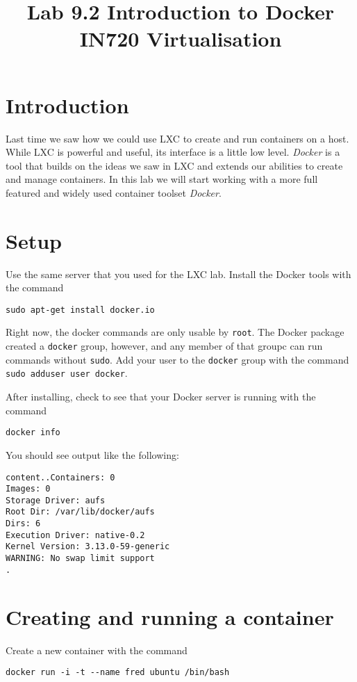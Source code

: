 \documentclass{article}
\begin{document}
\title{Lab 9.2 Introduction to Docker\\ IN720 Virtualisation}
\date{}
\maketitle

\section*{Introduction}
Last time we saw how we could use LXC to create and run containers on a host. While LXC is powerful and useful, its interface is a little low level. \emph{Docker} is a tool that builds on the ideas we saw in LXC and extends our abilities to create and manage containers.  In this lab we will start working with a more full featured and widely used container toolset \emph{Docker}.

\section{Setup}
Use the same server that you used for the LXC lab.  Install the Docker tools with the command

\texttt{sudo apt-get install docker.io}

Right now, the docker commands are only usable by \texttt{root}. The Docker package created a \texttt{docker} group, however, and any member of that groupc can run commands without \texttt{sudo}. Add your user to the \texttt{docker} group with the command \texttt{sudo adduser user docker}.

After installing, check to see that your Docker server is running with the command 

\texttt{docker info}

You should see output like the following:

\begin{verbatim}
content..Containers: 0
Images: 0
Storage Driver: aufs
Root Dir: /var/lib/docker/aufs
Dirs: 6
Execution Driver: native-0.2
Kernel Version: 3.13.0-59-generic
WARNING: No swap limit support
.
\end{verbatim}

\section{Creating and running a container}

Create a new container with the command

\begin{verbatim}
docker run -i -t --name fred ubuntu /bin/bash
\end{verbatim}
\end{document}
